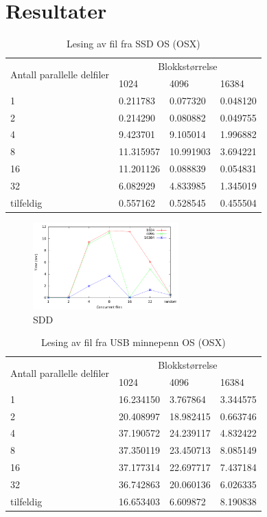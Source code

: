 \documentclass[titlepage]{article}
\begin{document}
\section{Resultater}

\begin{table}[h!]
\caption{Lesing av fil fra SSD OS (OSX)}
\label{SSD}
\centering
\begin{tabular}{|l|l|l|l|}
\hline
\multirow{2}{*}{ Antall parallelle delfiler} & \multicolumn{3}{|c|}{Blokkstørrelse} \\
 & 1024 & 4096 & 16384\\
\hline
1         &  0.211783  &  0.077320  & 0.048120 \\
2         &  0.214290  &  0.080882  & 0.049755 \\
4         &  9.423701  &  9.105014  & 1.996882 \\
8         & 11.315957  & 10.991903  & 3.694221 \\
16        & 11.201126  &  0.088839  & 0.054831 \\
32        &  6.082929  &  4.833985  & 1.345019 \\
tilfeldig &  0.557162  &  0.528545  & 0.455504 \\
\hline
\end{tabular}
\end{table}

\begin{figure}[h!]
  \caption{SDD}
  \label{fig:sdd}
  \centering
  \includegraphics[width=0.5\textwidth]{res/result-sdd}
\end{figure}

\begin{table}[h!]
\caption{Lesing av fil fra USB minnepenn OS (OSX)}
\label{USB}
\centering
\begin{tabular}{|l|l|l|l|}
\hline
\multirow{2}{*}{ Antall parallelle delfiler} & \multicolumn{3}{|c|}{Blokkstørrelse} \\
 & 1024 & 4096 & 16384\\
\hline
1         &  16.234150 &   3.767864 &  3.344575 \\
2         &  20.408997 &  18.982415 &  0.663746 \\
4         &  37.190572 &  24.239117 &  4.832422 \\
8         &  37.350119 &  23.450713 &  8.085149 \\
16        &  37.177314 &  22.697717 &  7.437184 \\
32        &  36.742863 &  20.060136 &  6.026335 \\
tilfeldig &  16.653403 &   6.609872 &  8.190838 \\
\hline
\end{tabular}
\end{table}
\end{document}
